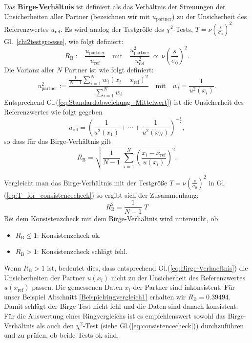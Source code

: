 Das \textbf{Birge-Verhältnis} ist definiert als das Verhältnis der Streuungen der Unsicherheiten aller Partner
(bezeichnen wir mit $u_\mathrm{partner}$) zu der Unsicherheit des Referenzwertes $u_\mathrm{ref}$. Es wird
analog der Testgröße des $\chi^2$-Tests, $T = \nu \left(\frac{s}{\sigma_0}\right)^2$ Gl.~\ref{chi2testgroesse}, wie
folgt definiert:
\begin{equation}
R_\mathrm{B} := \frac{u_\mathrm{partner}}{u_\mathrm{ref}}
\quad \text{mit} \quad
\frac{u^2_\mathrm{partner}}{u^2_\mathrm{ref}} \, \propto \,
\nu \left(\frac{s}{\sigma_0}\right)^2.
\end{equation}
Die Varianz aller $N$ Partner ist wie folgt definiert:
\begin{equation}
u^2_\mathrm{partner} := \frac{\frac{1}{N-1} \sum\limits_{i=1}^{N} w_i \left(x_i-x_\mathrm{ref} \right)^2}
{\sum\limits_{i=1}^{N} w_i} \quad \text{mit} \quad w_i = \frac{1}{u^2(x_i)} .
\end{equation}
Entsprechend Gl.(\ref{eq:Standardabweichung_Mittelwert}) ist die Unsicherheit des Referenzwertes wie folgt gegeben
\begin{equation}
u_\mathrm{ref} = \left(\frac{1}{u^2(x_1)} +  \cdots + \frac{1}{u^2(x_N)} \right)^{-\frac{1}{2}},
\end{equation}
so dass für das Birge-Verhältnis gilt
\begin{equation}
R_\mathrm{B} = \sqrt{\frac{1}{N-1} \; \sum_{i=1}^N \left( \frac{x_i-x_\mathrm{ref}}{u(x_i)} \right)^2 }.
		\label{eq:Birge-Verhaeltnis}
\end{equation}

Vergleicht man das Birge-Verhältnis mit der Testgröße $T = \nu \left(\frac{s}{\sigma_0}\right)^2$ in Gl.(\ref{eq:T_for_consistencecheck}) so ergibt sich der Zusammenhang:
\begin{equation}
R_\mathrm{B}^2 = \frac{1}{N-1} \; T
\end{equation}
Bei dem Konsistenzcheck mit dem Birge-Verhältnis wird untersucht, ob
\begin{itemize}
	\item $R_\mathrm{B} \le 1$: Konsistenzcheck ok.
	\item $R_\mathrm{B} > 1$: Konsistenzcheck schlägt fehl.
\end{itemize}
Wenn $R_\mathrm{B} > 1$ ist, bedeutet dies, dass entsprechend Gl.(\ref{eq:Birge-Verhaeltnis}) die Unsicherheiten der Partner
$u(x_i)$ nicht zu der Unsicherheit des Referenzwertes $u(x_\mathrm{ref})$ passen.
Die gemessenen Daten $x_i$ der Partner sind inkonsistent.
Für unser Beispiel Abschnitt \ref{Beispielringvergleich1} erhalten wir $R_\mathrm{B} = 0.39494$.
Damit schlägt der Birge-Test nicht fehl und die Daten sind
danach konsistent. Für die Auswertung eines Ringvergleichs ist es empfehlenswert sowohl das Birge-Verhältnis als auch den $\chi^2$-Test
(siehe Gl.(\ref{eq:consistencecheck})) durchzuführen und zu prüfen, ob beide Tests ok sind.

